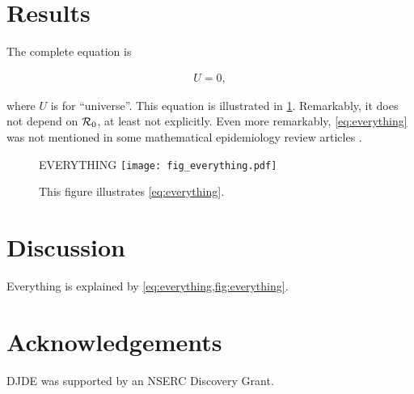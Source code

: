 \documentclass[12pt]{article}
\begin{document}
\section{Results}\label{sec:results}

The complete equation is
\begin{linenomath*}
\begin{align}\label{eq:everything}
  U = 0,
\end{align}
\end{linenomath*}
where $U$ is for ``universe''.  This equation is illustrated
in \cref{fig:everything}.  Remarkably, it does not depend on ${\mathcal R}_0$,
at least not explicitly.  Even more remarkably, \cref{eq:everything}
was not mentioned in some mathematical epidemiology review articles
\cite{Earn+02,Earn04,Earn08,Earn09}.

\begin{figure}
  \begin{center}
    \Huge EVERYTHING
    \texttt{[image: fig\_everything.pdf]}
  \end{center}
  \caption{This figure illustrates \cref{eq:everything}.}
  \label{fig:everything}
\end{figure}

\section{Discussion}\label{sec:discussion}

Everything is explained by \cref{eq:everything,fig:everything}.

\section*{Acknowledgements}

DJDE was supported by an NSERC Discovery Grant.






\end{document}
